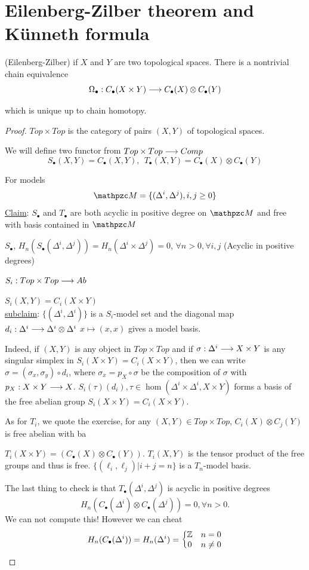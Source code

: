 \documentclass[11pt]{book} %
\begin{document}
\section{Eilenberg-Zilber theorem and K\"unneth formula}
\begin{theorem}
(Eilenberg-Zilber) if $X$ and $Y$ are two topological spaces. There is a nontrivial chain equivalence
$$
\Omega_\bullet: C_\bullet(X\times Y)\longrightarrow C_\bullet(X)\otimes C_\bullet (Y)
$$

which is unique up to chain homotopy.
\end{theorem}
\begin{proof}
$Top\times Top$ is the category of pairs $(X,Y)$ of topological spaces.

We will define two functor from $Top\times Top\longrightarrow Comp$
$$S_\bullet(X,Y)=C_\bullet(X,Y),\ \  T_\bullet (X,Y)=C_\bullet(X)\otimes C_\bullet(Y)$$

For models
$$
\pzm=\{(\Delta^i,\Delta^j), i,j \geq 0\}
$$ 
\underline{Claim}: $S_\bullet$ and $T_\bullet$ are both acyclic in positive degree on $\pzm$ and free with basis contained in $\pzm$

$S_\bullet$, $H_n(S_\bullet(\Delta^i, \Delta^j))=H_n(\Delta^i\times \Delta^j)=0$, $\forall n>0, \forall i,j$ (Acyclic in positive degrees)

$S_i: Top\times Top\longrightarrow Ab$

$S_i(X, Y)=C_i (X\times Y)$\\
\underline{subclaim}: $\{(\Delta^i,\Delta^i)\}$ is a $S_i$-model set and the diagonal map $d_i:\Delta^i\longrightarrow\Delta^i\otimes \Delta^i$  $x\mapsto (x,x)$ gives a model basis.

Indeed, if $(X,Y)$ is any object in $Top\times Top$ and if $
\sigma: \Delta^i\longrightarrow X\times Y
$ is any singular simplex in $S_i(X\times Y)=C_i(X\times Y)$, then we can write 
$\sigma=(\sigma_x,\sigma_y)\circ d_i$,  where $\sigma_x=p_X\circ \sigma$ be the composition of $\sigma$ with $p_X:X\times Y\longrightarrow X$.
$S_i(\tau)(d_i), \tau\in \hom(\Delta^i\times \Delta^i,X\times Y)$ forms a basis of the free abelian group $S_i(X\times Y)=C_i(X\times Y)$.

As for $T_i$, we quote the exercise, for any $(X,Y)\in Top\times Top$, $C_i(X)\otimes C_j(Y)$ is free abelian with ba

 $T_i(X\times Y)=(C_\bullet(X)\otimes C_\bullet(Y))$. $T_i(X, Y)$ is the tensor product of the free groups and thus is free.
$\{(\ell_i,\ell_j)|i+j=n\}$ is a $T_n$-model basis.

The last thing to check is that $T_\bullet(\Delta^i, \Delta^j)$ is acyclic in positive degrees
$$
H_n(C_\bullet(\Delta^i)\otimes C_\bullet(\Delta^j))=0,\forall n>0.
$$
We can not compute this! However we can cheat
$$
H_n(C_\bullet(\Delta^i))=H_n(\Delta^i)=\left\{\begin{matrix}
 \mathbb Z & n=0\\
 0 & n\neq 0
\end{matrix}\right.
$$


\end{proof}
\end{document}

